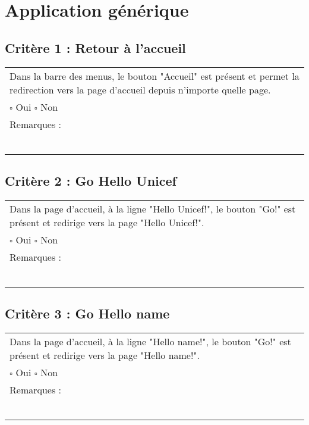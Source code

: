
\section{Application générique}
	
	\subsection*{Critère 1 : Retour à l'accueil}
	
	\begin{center}
    	 		\begin{tabular}[h]{|p{}|}
			\hline
				Dans la barre des menus, le bouton "Accueil" est présent et permet la redirection vers la page d'accueil depuis n'importe quelle page. \\
				$\square$ Oui \hfill \hfill $\square$ Non \\\hline Remarques : \\ ~\\
			 \\\hline
     		\end{tabular}
  		\end{center}	
  		
  		
	\subsection*{Critère 2 : Go Hello Unicef}
	
	\begin{center}
    	 		\begin{tabular}[h]{|p{}|}
			\hline
				Dans la page d'accueil, à la ligne "Hello Unicef!", le bouton "Go!" est présent et redirige vers la page "Hello Unicef!". \\
				$\square$ Oui  \hfill \hfill $\square$ Non \\\hline Remarques : \\ ~\\
			 \\\hline
     		\end{tabular}
  		\end{center}	
  		
  	\subsection*{Critère 3 : Go Hello name}
	
	\begin{center}
    	 		\begin{tabular}[h]{|p{}|}
			\hline
				Dans la page d'accueil, à la ligne "Hello name!", le bouton "Go!" est présent et redirige vers la page "Hello name!". \\
				$\square$ Oui  \hfill \hfill $\square$ Non \\\hline Remarques : \\ ~\\
			 \\\hline
     		\end{tabular}
  		\end{center}	
  		

